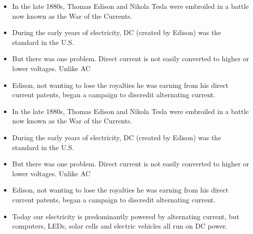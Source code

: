 \documentclass[preview]{standalone}
\begin{document}
\centering \begin{itemize}\item In the late 1880s, Thomas Edison and Nikola Tesla were embroiled in a battle now known as the War of the Currents.\item During the early years of electricity, DC (created by Edison) was the standard in the U.S.\item But there was one problem. Direct current is not easily converted to higher or lower voltages. Unlike AC\item Edison, not wanting to lose the royalties he was earning from his direct current patents, began a campaign to discredit alternating current.\end{itemize} \begin{itemize}\item In the late 1880s, Thomas Edison and Nikola Tesla were embroiled in a battle now known as the War of the Currents.\item During the early years of electricity, DC (created by Edison) was the standard in the U.S.\item But there was one problem. Direct current is not easily converted to higher or lower voltages. Unlike AC\item Edison, not wanting to lose the royalties he was earning from his direct current patents, began a campaign to discredit alternating current.\item Today our electricity is predominantly powered by alternating current, but computers, LEDs, solar cells and electric vehicles all run on DC power. \end{itemize}
\end{document}
